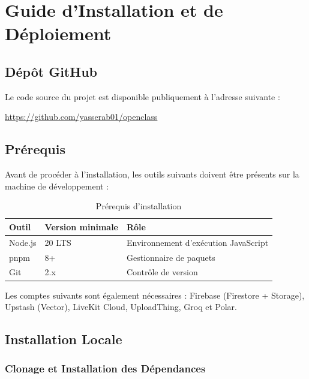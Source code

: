 \documentclass[12pt, a4paper, twoside]{report}
\begin{document}
\chapter{Guide d'Installation et de Déploiement}

\section{Dépôt GitHub}

Le code source du projet est disponible publiquement à l'adresse suivante :

\begin{center}
  \url{https://github.com/yasserab01/openclass}
\end{center}

\section{Prérequis}

Avant de procéder à l'installation, les outils suivants doivent être présents
sur la machine de développement :

\begin{table}[H]
  \begin{tabularx}{\textwidth}{|l|l|X|}
    \hline
    \textbf{Outil} & \textbf{Version minimale} & \textbf{Rôle} \\
    \hline
    Node.js  & 20 LTS & Environnement d'exécution JavaScript \\
    pnpm     & 8+     & Gestionnaire de paquets \\
    Git      & 2.x    & Contrôle de version \\
    \hline
  \end{tabularx}
  \caption{Prérequis d'installation}
  \label{tab:prereqs}
\end{table}

Les comptes suivants sont également nécessaires : Firebase (Firestore + Storage),
Upstash (Vector), LiveKit Cloud, UploadThing, Groq et Polar.

\section{Installation Locale}

\subsection{Clonage et Installation des Dépendances}
\end{document}
